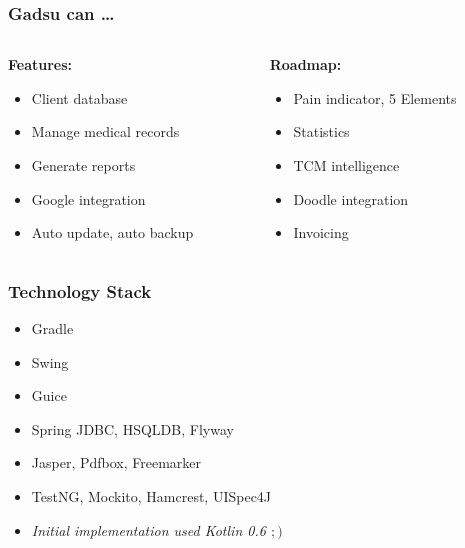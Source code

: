 \begin{frame}[t]
\frametitle{Gadsu can \ldots}
\begin{columns}[t]
\begin{column}{0.5\textwidth}
	\textbf{Features:}
	\begin{itemize}
		\item Client database
		\item Manage medical records
		\item Generate reports
		\item Google integration
		\item Auto update, auto backup
	\end{itemize}
\end{column}
\pause
\begin{column}{0.5\textwidth} 
	\textbf{Roadmap:}
	\begin{itemize}
		\item Pain indicator, 5 Elements
		\item Statistics
		\item TCM intelligence
		\item Doodle integration
		\item Invoicing
	\end{itemize}
\end{column}
\end{columns}
\end{frame}

\begin{frame}
\frametitle{Technology Stack}
\begin{itemize}[<+->]
	\item Gradle
	\item Swing
	\item Guice
	\item Spring JDBC, HSQLDB, Flyway
	\item Jasper, Pdfbox, Freemarker
	\item TestNG, Mockito, Hamcrest, UISpec4J
	\item \textit{Initial implementation used Kotlin 0.6 $;)$}
\end{itemize}
\end{frame}





